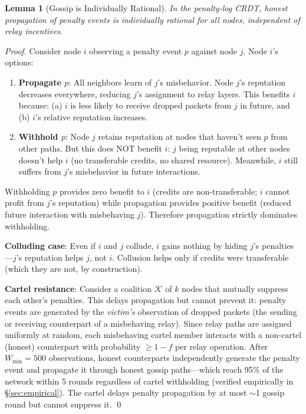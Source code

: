 \documentclass[11pt,a4paper]{article}
\newtheorem{lemma}[theorem]{Lemma}
\begin{document}
\begin{lemma}[Gossip is Individually Rational]
\label{lem:gossip}
In the penalty-log CRDT, honest propagation of penalty events is individually rational for all nodes, independent of relay incentives.
\end{lemma}

\begin{proof}
Consider node $i$ observing a penalty event $p$ against node $j$. Node $i$'s options:
\begin{enumerate}[nosep]
    \item \textbf{Propagate $p$}: All neighbors learn of $j$'s misbehavior. Node $j$'s reputation decreases everywhere, reducing $j$'s assignment to relay layers. This benefits $i$ because: (a) $i$ is less likely to receive dropped packets from $j$ in future, and (b) $i$'s relative reputation increases.
    \item \textbf{Withhold $p$}: Node $j$ retains reputation at nodes that haven't seen $p$ from other paths. But this does NOT benefit $i$: $j$ being reputable at other nodes doesn't help $i$ (no transferable credits, no shared resource). Meanwhile, $i$ still suffers from $j$'s misbehavior in future interactions.
\end{enumerate}

Withholding $p$ provides zero benefit to $i$ (credits are non-transferable; $i$ cannot profit from $j$'s reputation) while propagation provides positive benefit (reduced future interaction with misbehaving $j$). Therefore propagation strictly dominates withholding.

\textbf{Colluding case}: Even if $i$ and $j$ collude, $i$ gains nothing by hiding $j$'s penalties---$j$'s reputation helps $j$, not $i$. Collusion helps only if credits were transferable (which they are not, by construction).

\textbf{Cartel resistance}: Consider a coalition $\mathcal{K}$ of $k$ nodes that mutually suppress each other's penalties. This delays propagation but cannot prevent it: penalty events are generated by the \emph{victim's} observation of dropped packets (the sending or receiving counterpart of a misbehaving relay). Since relay paths are assigned uniformly at random, each misbehaving cartel member interacts with a non-cartel (honest) counterpart with probability $\geq 1 - f$ per relay operation. After $W_{\min} = 500$ observations, honest counterparts independently generate the penalty event and propagate it through honest gossip paths---which reach 95\% of the network within 5 rounds regardless of cartel withholding (verified empirically in \S\ref{sec:empirical}). The cartel delays penalty propagation by at most $\sim$1 gossip round but cannot suppress it. \qed
\end{proof}
\end{document}
